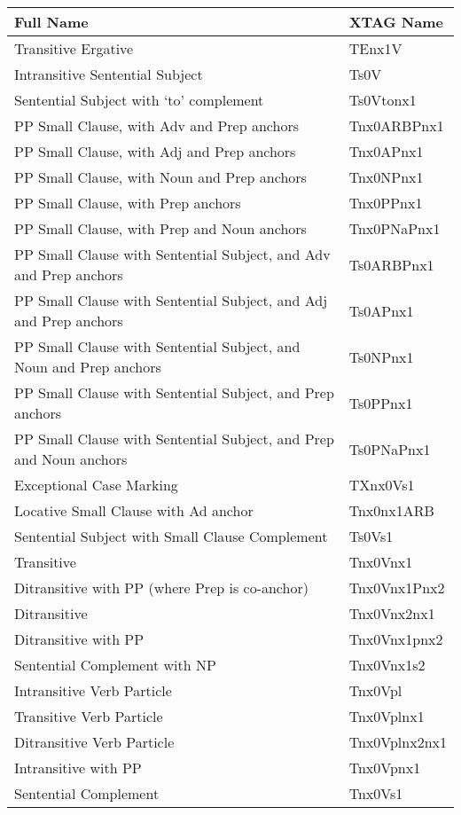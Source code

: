 \begin{tabular}{ll}
\end{tabular}
\normalsize

\footnotesize
\begin{tabular}{ll}
Full Name&XTAG Name\\
\hline
Transitive Ergative  &  TEnx1V\\
Intransitive Sentential Subject &  Ts0V\\
Sentential Subject with `to' complement &  Ts0Vtonx1\\
PP Small Clause, with Adv and Prep anchors & Tnx0ARBPnx1\\
PP Small Clause, with Adj and Prep anchors & Tnx0APnx1\\
PP Small Clause, with Noun and Prep anchors & Tnx0NPnx1\\
PP Small Clause, with Prep anchors & Tnx0PPnx1\\
PP Small Clause, with Prep and Noun anchors & Tnx0PNaPnx1\\
PP Small Clause with Sentential Subject, and Adv and Prep anchors & Ts0ARBPnx1\\
PP Small Clause with Sentential Subject, and Adj and Prep anchors & Ts0APnx1\\
PP Small Clause with Sentential Subject, and Noun and Prep anchors & Ts0NPnx1\\
PP Small Clause with Sentential Subject, and Prep anchors & Ts0PPnx1\\
PP Small Clause with Sentential Subject, and Prep and Noun anchors & Ts0PNaPnx1\\
Exceptional Case Marking & TXnx0Vs1\\
Locative Small Clause with Ad anchor & Tnx0nx1ARB\\
Sentential Subject with Small Clause Complement & Ts0Vs1\\
Transitive & Tnx0Vnx1\\
Ditransitive with PP (where Prep is co-anchor) & Tnx0Vnx1Pnx2\\
Ditransitive & Tnx0Vnx2nx1\\
Ditransitive with PP & Tnx0Vnx1pnx2\\
Sentential Complement with NP & Tnx0Vnx1s2\\
Intransitive Verb Particle & Tnx0Vpl\\
Transitive Verb Particle & Tnx0Vplnx1\\
Ditransitive Verb Particle & Tnx0Vplnx2nx1\\
Intransitive with PP & Tnx0Vpnx1\\
Sentential Complement & Tnx0Vs1\\

\end{tabular}
